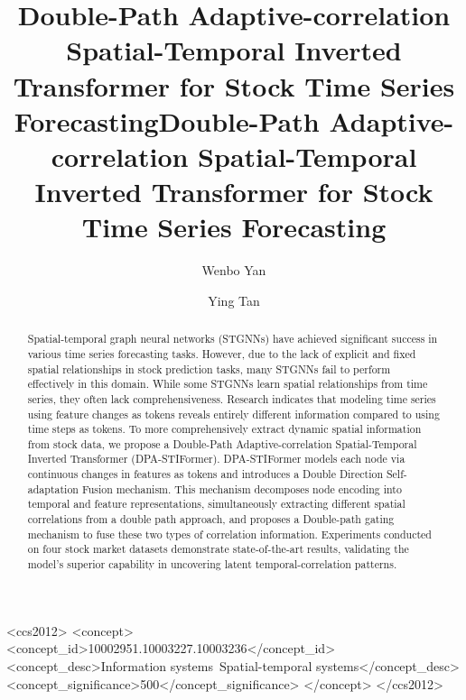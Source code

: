 \title{Double-Path Adaptive-correlation Spatial-Temporal Inverted Transformer for Stock Time Series Forecasting}



\title{Double-Path Adaptive-correlation Spatial-Temporal Inverted Transformer for Stock Time Series Forecasting}

\author{Wenbo Yan}

\author{Ying Tan}

\begin{abstract}
    Spatial-temporal graph neural networks (STGNNs) have achieved significant success in various time series forecasting tasks. However, due to the lack of explicit and fixed spatial relationships in stock prediction tasks, many STGNNs fail to perform effectively in this domain. While some STGNNs learn spatial relationships from time series, they often lack comprehensiveness. Research indicates that modeling time series using feature changes as tokens reveals entirely different information compared to using time steps as tokens. To more comprehensively extract dynamic spatial information from stock data, we propose a Double-Path Adaptive-correlation Spatial-Temporal Inverted Transformer (DPA-STIFormer). DPA-STIFormer models each node via continuous changes in features as tokens and introduces a Double Direction Self-adaptation Fusion mechanism. This mechanism decomposes node encoding into temporal and feature representations, simultaneously extracting different spatial correlations from a double path approach, and proposes a Double-path gating mechanism to fuse these two types of correlation information. Experiments conducted on four stock market datasets demonstrate state-of-the-art results, validating the model's superior capability in uncovering latent temporal-correlation patterns.
\end{abstract}

\begin{CCSXML}
<ccs2012>
   <concept>
       <concept_id>10002951.10003227.10003236</concept_id>
       <concept_desc>Information systems~Spatial-temporal systems</concept_desc>
       <concept_significance>500</concept_significance>
       </concept>
 </ccs2012> 
\end{CCSXML}

